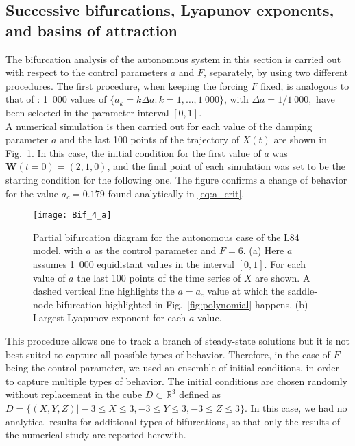 \documentclass[%
 aip, cha,
 amsmath,amssymb,
 reprint,%
author-year,%
]{revtex4-1}
\newcommand{\W}{\mathbf W}
\newcommand{\0}{\mathbf 0}
\begin{document}
\subsection{Successive bifurcations, Lyapunov exponents, and basins of attraction}
\label{sec:subsection_bif}
The bifurcation analysis of the autonomous system in this section is carried out with respect to the control parameters $a$ and $F$, separately, by using two different procedures. The first procedure, when keeping the forcing $F$ fixed, is analogous to that of \cite{Broer}: 1~000 values of $\{a_k = k \Delta a: k = 1, \ldots, 1~000\}$, with $\Delta a = 1/1~000,$ have been selected in the parameter interval $[0,1]$.\\
A numerical simulation is then carried out for each value of the damping parameter $a$ and the last 100 points of the trajectory of $X(t)$ are shown in Fig.~\ref{fig:bifurcation_a}. 
In this case, the initial condition for the first value of $a$ was ${\W(t = 0)} = (2, 1, 0)$, and the final point of each simulation was set to be the starting condition for the following one. The figure confirms a change of behavior for the value $a_c = 0.179$ found analytically in \eqref{eq:a_crit}. \\
\begin{figure}[h]
	\hspace{-10pt}
    \texttt{[image: Bif\_4\_a]}
    \caption{Partial bifurcation diagram for the autonomous case of the L84 model, with $a$ as the control parameter and $F = 6$. (a) Here $a$ assumes 1~000 equidistant values in the interval $[0,1]$. For each value of $a$ the last 100 points of the time series of $X$ are shown.
    A dashed vertical line highlights the $a = a_c$ value at which the saddle-node bifurcation highlighted in Fig.~\ref{fig:polynomial} happens. (b) Largest Lyapunov exponent for each $a$-value.}
    \label{fig:bifurcation_a}
\end{figure}
This procedure allows one to track a branch of steady-state solutions but it is not best suited to capture all possible types of behavior. Therefore, in the case of $F$ being the control parameter, we used an ensemble of initial conditions, in order to capture multiple types of behavior. 
The initial conditions are chosen randomly without replacement in the cube $D \subset \mathbb{R}^3$ defined as $D = \{(X,Y,Z) \vert -3  \le X \le 3, -3 \le Y \le 3, -3 \le Z \le 3 \}.$ 
In this case, we had no analytical results for additional types of bifurcations, so that only the results of the numerical study are reported herewith. \\
\end{document}
